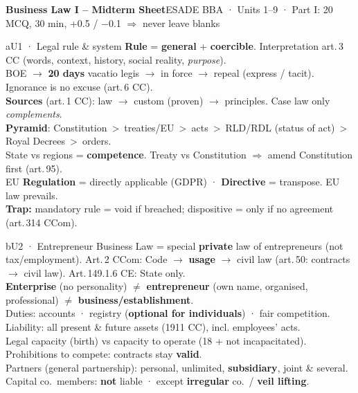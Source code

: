 \documentclass[9pt]{extarticle}
\newcommand{\T}[1]{{\color{trap}\textbf{Trap:} #1}}
\newcommand{\col}[2]{\begin{minipage}[t]{#1\linewidth}\vspace{0pt}#2\end{minipage}}
\begin{document}
{\Large\bfseries Business Law I -- Midterm Sheet}\hfill{\small ESADE BBA · Units 1--9 · Part I: 20 MCQ, 30 min, +0.5 / $-$0.1 \(\Rightarrow\) never leave blanks}\par\vspace{-1mm}

\col{0.49}{
\begin{bx}{a}{U1 · Legal rule \& system}
\textbf{Rule} = \textbf{general} + \textbf{coercible}. Interpretation art.\,3 CC (words, context, history, social reality, \textit{purpose}).\\
BOE $\rightarrow$ \textbf{20 days} vacatio legis $\rightarrow$ in force $\rightarrow$ repeal (express / tacit). Ignorance is no excuse (art.\,6 CC).\\
\textbf{Sources} (art.\,1 CC): law $\rightarrow$ custom (proven) $\rightarrow$ principles. Case law only \textit{complements}.\\
\textbf{Pyramid}: Constitution \,>\, treaties/EU \,>\, acts \,>\, RLD/RDL (status of act) \,>\, Royal Decrees \,>\, orders.\\
State vs regions = \textbf{competence}. Treaty vs Constitution $\Rightarrow$ amend Constitution first (art.\,95).\\
EU \textbf{Regulation} = directly applicable (GDPR) · \textbf{Directive} = transpose. EU law prevails.\\
\T{mandatory rule = void if breached; dispositive = only if no agreement (art.\,314 CCom).}
\end{bx}
\begin{bx}{b}{U2 · Entrepreneur}
Business Law = special \textbf{private} law of entrepreneurs (not tax/employment). Art.\,2 CCom: Code $\rightarrow$ \textbf{usage} $\rightarrow$ civil law (art.\,50: contracts $\rightarrow$ civil law). Art.\,149.1.6 CE: State only.\\
\textbf{Enterprise} (no personality) $\neq$ \textbf{entrepreneur} (own name, organised, professional) $\neq$ \textbf{business/establishment}.\\
Duties: accounts · registry (\textbf{optional for individuals}) · fair competition. Liability: all present \& future assets (1911 CC), incl. employees' acts.\\
Legal capacity (birth) vs capacity to operate (18 + not incapacitated). Prohibitions to compete: contracts stay \textbf{valid}.\\
Partners (general partnership): personal, unlimited, \textbf{subsidiary}, joint \& several. Capital co.\ members: \textbf{not} liable · except \textbf{irregular} co.\ / \textbf{veil lifting}.

\end{bx}}
\end{document}
